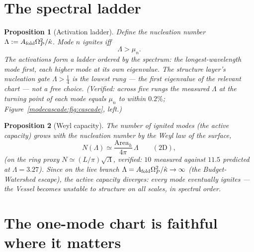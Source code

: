 \documentclass[11pt,a4paper,oneside]{book}
\newcommand{\Op}{\Omega_P}
\newcommand{\Afold}{A_{\rm fold}}
\newcommand{\kw}{\hat\kappa}
\theoremstyle{plain}
\newtheorem{proposition}{Proposition}[chapter]
\theoremstyle{definition}
\theoremstyle{remark}
\begin{document}
\section{The spectral ladder}

\begin{proposition}[Activation ladder]\label{modecascade:prop:ladder}
Define the nucleation number $\Lambda:=\Afold\Op^2/\kw$. Mode $n$ ignites iff
\begin{equation}
\boxed{\;\Lambda>\mu_n.\;}
\end{equation}
The activations form a ladder ordered by the spectrum: the longest-wavelength mode first, each higher
mode at its own eigenvalue. The structure layer's nucleation gate $\Lambda>\tfrac14$ is the lowest
rung --- the first eigenvalue of the relevant chart --- not a free choice. (Verified: across five
rungs the measured $\Lambda$ at the turning point of each mode equals $\mu_n$ to within $0.2\%$;
Figure~\ref{modecascade:fig:cascade}, left.)
\end{proposition}

\begin{proposition}[Weyl capacity]\label{modecascade:prop:weyl}
The number of ignited modes (the \emph{active capacity}) grows with the nucleation number by the Weyl
law of the surface,
\begin{equation}
N(\Lambda)\simeq\frac{\mathrm{Area}_h}{4\pi}\,\Lambda
\qquad(\text{2D}),
\end{equation}
(on the ring proxy $N\simeq(L/\pi)\sqrt{\Lambda}$, verified: $10$ measured against $11.5$ predicted
at $\Lambda=3.27$). Since on the live branch $\Lambda=\Afold\Op^2/\kw\to\infty$ (the Budget-Watershed
escape), the active capacity diverges: \emph{every} mode eventually ignites --- the Vessel becomes
unstable to structure on all scales, in spectral order.
\end{proposition}

\section{The one-mode chart is faithful where it matters}
\end{document}
